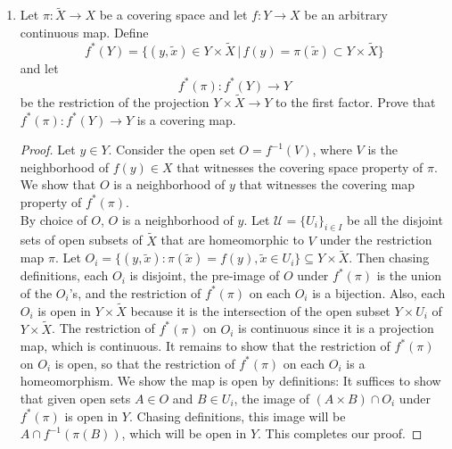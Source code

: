 \documentclass{article}
\begin{document}
\begin{enumerate}
\begin{proof}
      Given $U_i$, to obtain $U_{i+1}\subseteq U_i$, let $A$ and $B$ be
      disjoint neighborhoods of $x$ and $g_{i+1}\cdot x$ respectively. Note
      that because the action is free, $g_{i+1}\cdot x\neq x$, and then
      because $X$ is Hausdorff, neighborhoods $A$ and $B$ exist. Set
      $U_{i+i}$ to $U_i\cap A\cap g_{i+1}^{-1}(B)$. Then $U_{i+1}$ would
      be a neighborhood of $x$, and is disjoint from $g_{i+1}(U_{i+1})$
      because $g_{i+1}(U_{i+1})\subseteq B$, which is disjoint from
      $A\supseteq U_{i+1}$, as we wish to show.
    \end{proof}

  \item Let $\pi:\tilde{X}\rightarrow X$ be a covering space and let
    $f:Y\rightarrow X$ be an arbitrary continuous map. Define
    \begin{equation*}
      f^*(Y) = \{(y,\tilde{x})\in Y\times\tilde{X}\,|\,
      f(y)=\pi(\tilde{x})\subset Y\times\tilde{X}\}
    \end{equation*}
    and let
    \begin{equation*}
      f^*(\pi):f^*(Y)\rightarrow Y
    \end{equation*}
    be the restriction of the projection $Y\times\tilde{X}\rightarrow Y$ to
    the first factor. Prove that $f^*(\pi):f^*(Y)\rightarrow Y$ is a
    covering map.

    \begin{proof}
      Let $y\in Y$. Consider the open set $O=f^{-1}(V)$, where
      $V$ is the neighborhood of $f(y)\in X$ that witnesses the covering
      space property of $\pi$. We show that $O$ is a neighborhood of $y$
      that witnesses the covering map property of $f^*(\pi)$. \\

      By choice of $O$, $O$ is a neighborhood of $y$. Let
      $\mathcal{U}=\{U_i\}_{i\in I}$ be all the disjoint sets of open
      subsets of $\tilde{X}$ that are homeomorphic to $V$ under the
      restriction map $\pi$. Let
      $O_i=\{(y,\tilde{x}):\pi(\tilde{x})=f(y),\tilde{x}\in U_i\}\subseteq
      Y\times\tilde{X}$. Then chasing definitions, each $O_i$ is disjoint,
      the pre-image of $O$ under $f^*(\pi)$ is the union of the $O_i$'s,
      and the restriction of $f^*(\pi)$ on each $O_i$ is a bijection. Also,
      each $O_i$ is open in $Y\times\tilde{X}$ because it is the
      intersection of the open subset $Y\times U_i$ of $Y\times\tilde{X}$.
      The restriction of $f^*(\pi)$ on $O_i$ is continuous since it is a
      projection map, which is continuous. It remains to show that the
      restriction of $f^*(\pi)$ on $O_i$ is open, so that the restriction
      of $f^*(\pi)$ on each $O_i$ is a homeomorphism. We show the map is
      open by definitions: It suffices to show that given open sets $A\in
      O$ and $B\in U_i$, the image of $(A\times B)\cap O_i$ under
      $f^*(\pi)$ is open in $Y$. Chasing definitions, this image will be
      $A\cap f^{-1}(\pi(B))$, which will be open in $Y$. This completes our
      proof.
    \end{proof}


\end{enumerate}
\end{document}
